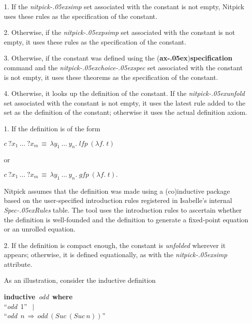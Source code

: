 \documentclass[a4paper,12pt]{article}
\renewcommand\_{\hbox{\textunderscore\kern-.05ex}}
\begin{document}
\begin{enum}
\item[1.] If the \textit{nitpick\_simp} set associated with the constant
is not empty, Nitpick uses these rules as the specification of the constant.

\item[2.] Otherwise, if the \textit{nitpick\_psimp} set associated with
the constant is not empty, it uses these rules as the specification of the
constant.

\item[3.] Otherwise, if the constant was defined using the
\hbox{(\textbf{ax\_})}\allowbreak\textbf{specification} command and the
\textit{nitpick\_choice\_spec} set associated with the constant is not empty, it
uses these theorems as the specification of the constant.

\item[4.] Otherwise, it looks up the definition of the constant. If the
\textit{nitpick\_unfold} set associated with the constant is not empty, it uses
the latest rule added to the set as the definition of the constant; otherwise it
uses the actual definition axiom.

\begin{enum}
\item[1.] If the definition is of the form

\qquad $c~{?}x_1~\ldots~{?}x_m \,\equiv\, \lambda y_1~\ldots~y_n.\; \textit{lfp}~(\lambda f.\; t)$

or

\qquad $c~{?}x_1~\ldots~{?}x_m \,\equiv\, \lambda y_1~\ldots~y_n.\; \textit{gfp}~(\lambda f.\; t).$

Nitpick assumes that the definition was made using a (co)inductive package
based on the user-specified introduction rules registered in Isabelle's internal
\textit{Spec\_Rules} table. The tool uses the introduction rules to ascertain
whether the definition is well-founded and the definition to generate a
fixed-point equation or an unrolled equation.

\item[2.] If the definition is compact enough, the constant is \textsl{unfolded}
wherever it appears; otherwise, it is defined equationally, as with
the \textit{nitpick\_simp} attribute.
\end{enum}
\end{enum}

As an illustration, consider the inductive definition

\prew
\textbf{inductive}~\textit{odd}~\textbf{where} \\
``\textit{odd}~1'' $\,\mid$ \\
``\textit{odd}~$n\,\Longrightarrow\, \textit{odd}~(\textit{Suc}~(\textit{Suc}~n))$''
\postw
\end{document}

